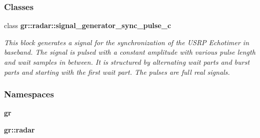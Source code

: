 \subsubsection*{Classes}
\begin{DoxyCompactItemize}
\item 
class {\bf gr\+::radar\+::signal\+\_\+generator\+\_\+sync\+\_\+pulse\+\_\+c}
\begin{DoxyCompactList}\small\item\em This block generates a signal for the synchronization of the U\+S\+RP Echotimer in baseband. The signal is pulsed with a constant amplitude with various pulse length and wait samples in between. It is structured by alternating wait parts and burst parts and starting with the first wait part. The pulses are full real signals. \end{DoxyCompactList}\end{DoxyCompactItemize}
\subsubsection*{Namespaces}
\begin{DoxyCompactItemize}
\item 
 {\bf gr}
\item 
 {\bf gr\+::radar}
\end{DoxyCompactItemize}
